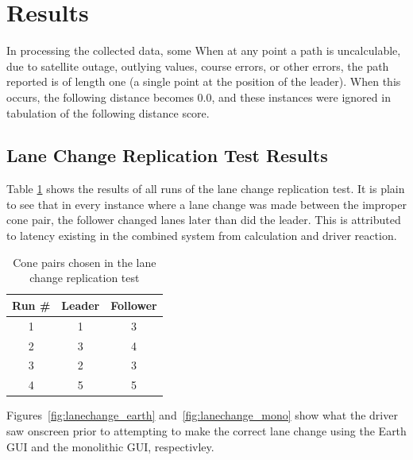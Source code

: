 \section{Results} \label{sec:results}

In processing the collected data, some
When at any point a path is uncalculable, due to satellite outage, outlying values, course errors, or other errors, the path reported is of length one (a single point at the position of the leader). When this occurs, the following distance becomes 0.0, and these instances were ignored in tabulation of the following distance score.


\subsection{Lane Change Replication Test Results} \label{sec:lanechangetestresults}

Table \ref{tab:lanechangeresults} shows the results of all runs of the lane change replication test. It is plain to see that in every instance where a lane change was made between the improper cone pair, the follower changed lanes later than did the leader. This is attributed to latency existing in the combined system from calculation and driver reaction.

\begin{table}[htbp] \centering \caption{Cone pairs chosen in the lane change replication test}
\begin{tabular}{c|cc} 
    Run \#  &     Leader&    Follower \\ \hline\hline
    1       &       1   &    3 \\
    2       &       3   &    4   \\
    3       &       2   &    3   \\
    4       &       5   &    5 \\ \hline   
\end{tabular} \label{tab:lanechangeresults} \end{table}

Figures~\ref{fig:lanechange_earth} and~\ref{fig:lanechange_mono} show what the driver saw onscreen prior to attempting to make the correct lane change using the Earth GUI and the monolithic GUI, respectivley.

